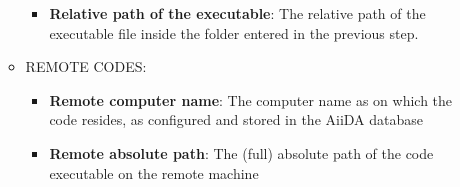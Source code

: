 \begin{appendices}
\begin{itemize}
\begin{itemize}
\begin{itemize}
\item {} 
\textbf{Relative path of the executable}: The relative path of the executable
file inside the folder entered in the previous step.

\end{itemize}

\item {} 
REMOTE CODES:
\begin{itemize}
\item {} 
\textbf{Remote computer name}: The computer name as on which the code resides,
as configured and stored in the AiiDA database

\item {} 
\textbf{Remote absolute path}: The (full) absolute path of the code executable
on the remote machine

\end{itemize}

\end{itemize}

\end{itemize}
\end{appendices}
